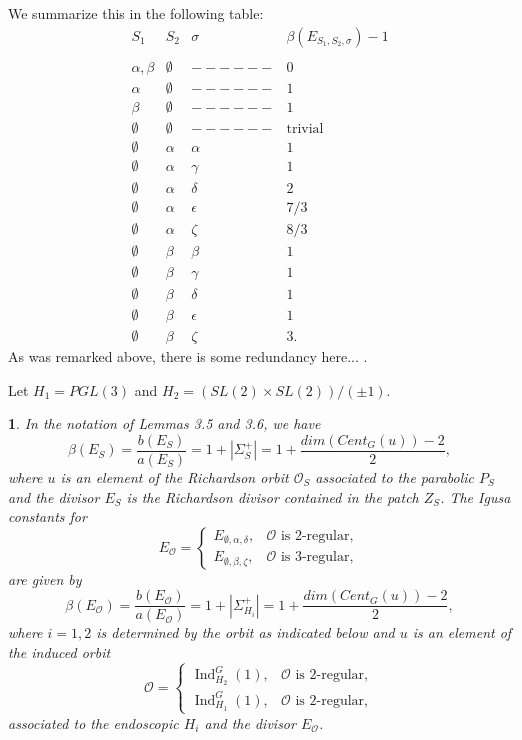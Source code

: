 \documentclass[12pt,letterpaper]{amsart}
\newcommand{\ooo}{\mathcal{O}}
\DeclareMathOperator{\Ind}{Ind}
\newcommand{\proclaimname}{}
\newtheorem*{proclaimx}{\proclaimname}
\newenvironment{proclaim}[1]%
  {\renewcommand{\proclaimname}{#1}\begin{proclaimx}}{\end{proclaimx}}
\begin{document}
\medskip
We summarize this in the following table:
\[
\begin{array}{cccc}
S_1&S_2&\sigma&\beta(E_{S_1,S_2,\sigma})-1\\
 & & &\\
\alpha,\beta&\emptyset&------&0\\
\alpha&\emptyset&------&1\\
\beta&\emptyset&------&1\\
\emptyset&\emptyset&------&\text{trivial}\\
\emptyset&\alpha&\alpha&1\\
\emptyset&\alpha&\gamma&1\\
\emptyset&\alpha&\delta&2\\
\emptyset&\alpha&\epsilon&7/3\\
\emptyset&\alpha&\zeta&8/3\\
\emptyset&\beta&\beta&1\\
\emptyset&\beta&\gamma&1\\
\emptyset&\beta&\delta&1\\
\emptyset&\beta&\epsilon&1\\
\emptyset&\beta&\zeta&3.
\end{array}
\tag{4.3}
\]
As was remarked above, there is some redundancy here... .

Let $H_1=PGL(3)$
and $H_2=(SL(2)\times SL(2))/(\pm 1)$.

\begin{proclaim}{Lemma 4.4} In the notation of Lemmas 3.5 and 3.6, we have
\[
\beta(E_S)=\frac{b(E_S)}{a(E_S)}=1+|\Sigma_S^+|=1+\frac{dim(Cent_G(u))-2}{2},
\]
where $u$ is an element of the Richardson orbit $\ooo_S$ associated to the
parabolic $P_S$ and the divisor $E_S$ is the
Richardson divisor contained in the patch $Z_S$.
The Igusa constants for
\[
E_{\ooo}=
\begin{cases}
E_{\emptyset,\alpha,\delta}, & \ooo \text{ is $2$-regular},\\
E_{\emptyset,\beta,\zeta}, &  \ooo \text{ is $3$-regular},
\end{cases}
\]
are given by
\[
\beta(E_{\ooo})=
\frac{b(E_{\ooo})}{a(E_{\ooo})}
=1+|\Sigma_{H_i}^+|=1+\frac{dim(Cent_G(u))-2}{2},
\]
where $i=1,2$ is determined by the orbit as indicated below and
$u$ is an element of the induced orbit
\[
\ooo=
\begin{cases}
\Ind_{H_2}^G(1), &\ooo \text{ is $2$-regular},\\
\Ind_{H_1}^G(1), &\ooo \text{ is $2$-regular},
\end{cases}
\]
associated to the endoscopic $H_i$ and the divisor $E_{\ooo}$.
\end{proclaim}
\end{document}
